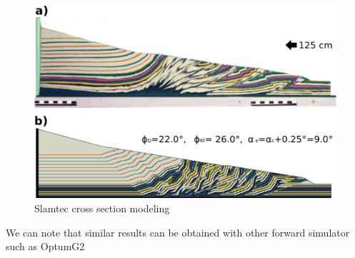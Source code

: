 \documentclass[12pt, a4paper]{report} %
\begin{document}
\begin{figure}[H]
	\centering
	\includegraphics[scale=0.5]{slamtec.png}
	\caption{Slamtec cross section modeling}
	\label{slam}
\end{figure}
We can note that similar results can be obtained with other forward simulator such as OptumG2 \cite{Optum}
\end{document}
